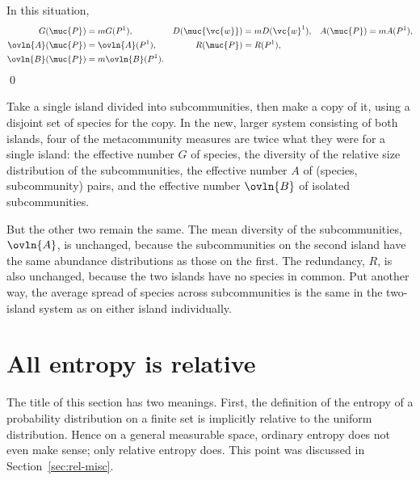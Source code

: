 \begin{cor}[Replication]
%
%
%
%
In this situation,
% 
\begin{align*}
G(\muc{P})      &= mG(P^1),     &
D(\muc{\vc{w}}) &= mD(\vc{w}^1),&
A(\muc{P})      &= mA(P^1),     \\
\ovln{A}(\muc{P})       &= \ovln{A}(P^1),       &
R(\muc{P})              &= R(P^1),              \\
\ovln{B}(\muc{P})       &= m\ovln{B}(P^1).
\end{align*}
\qed
\end{cor}

\begin{example}
Take a single island%
%
% 
divided into subcommunities, then make a copy of it, using a disjoint set
of species for the copy.  In the new, larger system consisting of both
islands, four of the metacommunity measures are twice what they were for a
single island: the effective number $G$ of species, the diversity of the
relative size distribution of the subcommunities, the effective number $A$
of (species, subcommunity) pairs, and the effective number $\ovln{B}$ of
isolated subcommunities.

But the other two remain the same.  The mean diversity of the
subcommunities, $\ovln{A}$, is unchanged, because the subcommunities on the
second island have the same abundance distributions as those on the first.
The redundancy, $R$, is also unchanged, because the two islands have no
species in common.  Put another way, the average spread of species across
subcommunities is the same in the two-island system as on either
island individually.
\end{example}


\section{All entropy is relative}


The title of this section has two meanings.  First, the definition of the
entropy of a probability distribution on a finite set is implicitly
relative to the uniform distribution.  Hence on a general measurable space,
ordinary entropy does not even make sense; only relative entropy does.
This point was discussed in Section~\ref{sec:rel-misc}.

